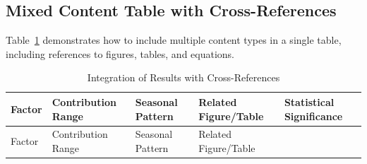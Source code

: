 \documentclass[
  letterpaper,
  oneside,
  openany]{MastersDoctoralThesis}
\begin{document}
\subsection{Mixed Content Table with
Cross-References}\label{sec-ch1-mixed-table}

Table~\ref{tbl-ch1-mixed} demonstrates how to include multiple content
types in a single table, including references to figures, tables, and
equations.

\begin{longtable}[]{@{}
  >{\raggedright\arraybackslash}p{}
  >{\raggedright\arraybackslash}p{}
  >{\raggedright\arraybackslash}p{}
  >{\raggedright\arraybackslash}p{}
  >{\raggedright\arraybackslash}p{}@{}}
\caption{Integration of Results with
Cross-References}\label{tbl-ch1-mixed}\tabularnewline
\toprule\noalign{}
\begin{minipage}[b]{\linewidth}\raggedright
Factor
\end{minipage} & \begin{minipage}[b]{\linewidth}\raggedright
Contribution Range
\end{minipage} & \begin{minipage}[b]{\linewidth}\raggedright
Seasonal Pattern
\end{minipage} & \begin{minipage}[b]{\linewidth}\raggedright
Related Figure/Table
\end{minipage} & \begin{minipage}[b]{\linewidth}\raggedright
Statistical Significance
\end{minipage} \\
\midrule\noalign{}
\endfirsthead
\toprule\noalign{}
\begin{minipage}[b]{\linewidth}\raggedright
Factor
\end{minipage} & \begin{minipage}[b]{\linewidth}\raggedright
Contribution Range
\end{minipage} & \begin{minipage}[b]{\linewidth}\raggedright
Seasonal Pattern
\end{minipage} & \begin{minipage}[b]{\linewidth}\raggedright
Related Figure/Table
\end{minipage} & \begin{minipage}[b]{\linewidth}\raggedright

\end{minipage}
\end{longtable}
\end{document}
